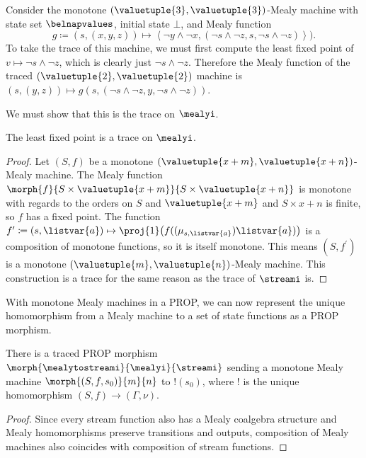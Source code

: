 \begin{example}\label{ex:trace-mealy}
    Consider the monotone \((\valuetuple{3},\valuetuple{3})\)-Mealy machine with
    state set \(\belnapvalues\), initial state \(\bot\), and Mealy function \[
        g \coloneqq (s, (x, y, z))
        \mapsto \left\langle \neg y \land \neg x,
        \left(\neg s \land \neg z, s, \neg s \land \neg z\right)
        \right\rangle
        ).\]
    To take the trace of this machine, we must first compute the least fixed
    point of \(v \mapsto \neg s \land \neg z\), which is clearly just
    \(\neg s \land \neg z\).
    Therefore the Mealy function of the traced
    \((\valuetuple{2}, \valuetuple{2})\) machine is \(
    (s, (y, z)) \mapsto g(s, (\neg s \land \neg z, y, \neg s \land \neg z))
    \).
\end{example}

We must show that this is the trace on \(\mealyi\).

\begin{proposition}
    The least fixed point is a trace on \(\mealyi\).
\end{proposition}
\begin{proof}
    Let \((S, f)\) be a monotone
    \((\valuetuple{x+m}, \valuetuple{x+n})\)-Mealy machine.
    The Mealy function \(
    \morph{f}{
        S \times \valuetuple{x+m}
    }{
        S \times \valuetuple{x+n}
    }
    \) is monotone with regards to the orders on \(S\) and
    \(\valuetuple{x+m}\) and \(S \times x+n\) is finite, so
    \(f\) has a fixed point.
    The function \(
    f^\prime \coloneqq (s, \listvar{a})
    \mapsto
    \proj{1}\mleft(f((\mu_{s,\listvar{a}})\listvar{a})\mright)
    \) is a composition of monotone functions, so it is itself monotone.
    This means \((S, f^\prime)\) is a monotone \(
    (\valuetuple{m}, \valuetuple{n})
    \)-Mealy machine.
    This construction is a trace for the same reason as the trace of
    \(\streami\) is.
\end{proof}

With monotone Mealy machines in a PROP, we can now represent the unique
homomorphism from a Mealy machine to a set of state functions as a PROP
morphism.

\begin{proposition}\label{prop:mealy-to-stream}
    There is a traced PROP morphism
    \(\morph{\mealytostreami}{\mealyi}{\streami}\) sending a monotone Mealy
    machine \(\morph{\left(S, f, s_0\right)}{m}{n}\) to \(!(s_0)\), where \(!\)
    is the unique homomorphism \((S,f) \to (\Gamma,\nu)\).
\end{proposition}
\begin{proof}
    Since every stream function also has a Mealy coalgebra structure and Mealy
    homomorphisms preserve transitions and outputs,
    composition of Mealy machines also coincides with composition of stream
    functions.
\end{proof}

